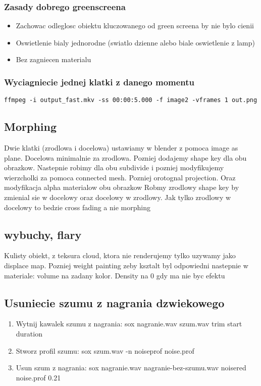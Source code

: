 \documentclass[a4paper,10pt]{article}
\begin{document}
\subsubsection{Zasady dobrego greenscreena}
\begin{itemize}
\item Zachowac odleglosc obiektu kluczowanego od green screena by nie bylo cienii
\item Oswietlenie bialy jednorodne (swiatlo dzienne alebo biale oswietlenie z lamp)  
\item Bez zagniecen materialu
\end{itemize}

\subsubsection{Wyciagniecie jednej klatki z danego momentu}
\begin{verbatim}
ffmpeg -i output_fast.mkv -ss 00:00:5.000 -f image2 -vframes 1 out.png
\end{verbatim}

\subsection{Morphing}
Dwie klatki (zrodlowa i docelowa) ustawiamy w blender z pomoca image as plane. Docelowa minimalnie za zrodlowa.
Pozniej dodajemy shape key dla obu obrazkow. Nastepnie robimy dla obu subdivide i pozniej modyfikujemy
wierzcholki za pomoca connected mesh. Pozniej orotognal projection. Oraz modyfikacja alpha materialow obu obrazkow
Robmy zrodlowy shape key by zmienial sie w docelowy oraz docelowy w zrodlowy. Jak tylko zrodlowy w docelowy to
bedzie cross fading a nie morphing

\subsection{wybuchy, flary}
Kulisty obiekt, z teksura cloud, ktora nie renderujemy tylko uzywamy jako
displace map. Pozniej weight painting zeby ksztalt byl odpowiedni
nastepnie w materiale: volume na zadany kolor.
Density na 0 gdy ma nie byc efektu

\subsection{Usuniecie szumu z nagrania dzwiekowego}
\begin{enumerate}
\item Wytnij kawalek szumu z nagrania: \textsf{sox nagranie.wav szum.wav trim start duration}
\item Stworz profil szumu: \textsf{sox szum.wav -n noiseprof noise.prof} 
\item Usun szum z nagrania: \textsf{sox nagranie.wav nagranie-bez-szumu.wav noisered noise.prof 0.21}
\end{enumerate}
\end{document}
